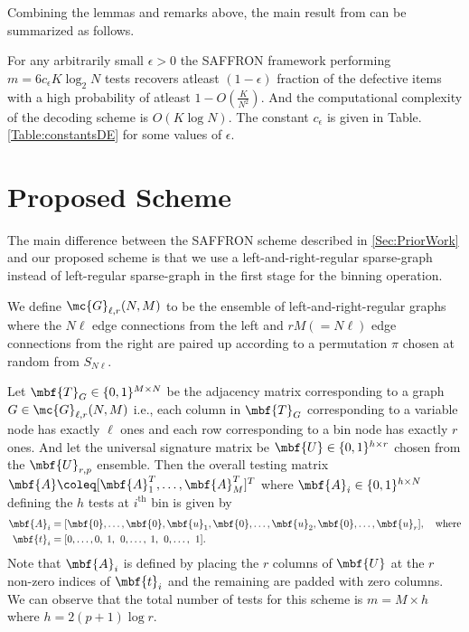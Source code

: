 \documentclass[conference,twocolumn]{IEEEtran}
\def\ceps{c_{\epsilon}}
\begin{document}
Combining the lemmas and remarks above, the main result from \cite{lee2015saffron} can be summarized as follows.
\begin{theorem}
For any arbitrarily small $\epsilon>0$ the SAFFRON framework performing $m=6\ceps K \log_{2}N$ tests recovers atleast $(1-\epsilon)$ fraction of the defective items with a high probability of atleast $1-O(\frac{K}{N^2})$. And the computational complexity of the decoding scheme is $O(K\log N)$. The constant $\ceps$ is given in Table. \ref{Table:constantsDE} for some values of $\epsilon$.
\end{theorem}

\section{Proposed Scheme}
The main difference between the SAFFRON scheme described in \ref{Sec:PriorWork} and our proposed scheme is that we use a left-and-right-regular sparse-graph instead of left-regular sparse-graph in the first stage for the binning operation.

\begin{definition}
We define $\mc{G}_{\ell,r}(N,M)$ to be the ensemble of left-and-right-regular graphs where the $N\ell$ edge connections from the left and $rM(=N\ell)$ edge connections from the right are paired up according to a permutation $\pi$ chosen at random from $S_{N\ell}$. 
\end{definition}

 Let $\mbf{T}_{G}\in\{0,1\}^{M\times N }$ be the adjacency matrix corresponding to a graph $G\in\mc{G}_{\ell,r}(N,M)$ i.e., each column in $\mbf{T}_{G}$ corresponding to a variable node has exactly $\ell$ ones and each row corresponding to a bin node has exactly $r$ ones. And let the universal signature matrix be $\mbf{U}\in\{0,1\}^{h \times r}$ chosen from the $\mbf{U}_{r,p}$ ensemble. Then the overall testing matrix $\mbf{A}\coleq [\mbf{A}_{1}^{T},\ldots,\mbf{A}_{M}^{T}]^T$ where $\mbf{A}_{i}\in\{0,1\}^{h\times N}$ defining the $h$ tests at $i^{\text{th}}$ bin is given by
 \begin{align}
 \mbf{A}_i&=[\mbf{0},\ldots,\mbf{0},\mbf{u}_1, \mbf{0},\ldots, \mbf{u}_2,\mbf{0}, \ldots, \mbf{u}_{r}],\quad \text{where}\label{Eqn:TestingMatrixDefn}\\
\mbf{t}_i &= [0,\ldots,0,\hspace{0.6ex}1,\hspace{0.9ex} 0, \ldots,\hspace{0.6ex}1,\hspace{0.9ex}0, \ldots, \hspace{0.9ex}1].\nonumber
 \end{align}
Note that $\mbf{A}_i$ is defined by placing the $r$ columns of $\mbf{U}$ at the $r$ non-zero indices of $\mbf{t}_i$ and the remaining are padded with zero columns. We can observe that the total number of tests for this scheme is $m=M\times h$ where $h=2(p+1)\log r$.
\end{document}

